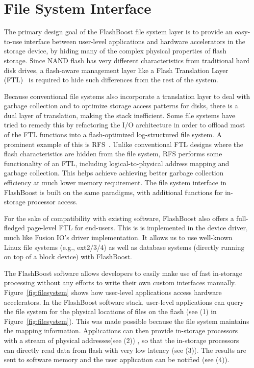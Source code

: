 \section{File System Interface}
\label{sec:software}

The primary design goal of the FlashBoost file system layer is to provide an
easy-to-use interface between user-level applications and hardware accelerators
in the storage device, by hiding many of the complex physical properties of
flash storage. Since NAND flash has very different characteristics from
traditional hard disk drives, a flash-aware management layer like a Flash
Translation Layer (FTL)~\cite{} is required to hide such differences from the
rest of the system.

Because conventional file systems also incorporate a translation layer to deal
with garbage collection and to optimize storage access patterns for disks, there
is a dual layer of translation, making the stack inefficient. Some file systems
have tried to remedy this by refactoring the I/O architecture in order to
offload most of the FTL functions into a flash-optimized log-structured file
system. A prominent example of this is RFS~\cite{rfs}. 
Unlike conventional FTL designs where the flash characteristics are
hidden from the file system, RFS performs some functionality of an FTL,
including logical-to-physical address mapping and garbage collection.
This helps achieve achieving better garbage collection
efficiency at much lower memory requirement. 
The file system interface in FlashBoost is built on the same paradigms, with
additional functions for in-storage processor access.

For the sake of compatibility with existing software, FlashBoost also offers a
full-fledged page-level FTL for end-users. This is is implemented in the device
driver, much like Fusion IO’s driver implementation. It allows us to use
well-known Linux file systems (e.g., ext2/3/4) as well as database systems
(directly running on top of a block device) with FlashBoost.

The FlashBoost software allows developers to easily make use of fast in-storage
processing without any efforts to write their own custom interfaces manually.
Figure~\ref{fig:filesystem} shows how user-level applications access hardware
accelerators.  In the FlashBoost software stack, user-level applications can
query the file system for the physical locations of files on the flash (see (1)
in Figure~\ref{fig:filesystem}). This was made possible because the file system
maintains the mapping information.  Applications can then provide in-storage
processors with a stream of physical addresses(see (2))
, so that the in-storage processors can directly read
data from flash with very low latency (see (3)).
The results are sent to software memory and the user application can be notified
(see (4)).


